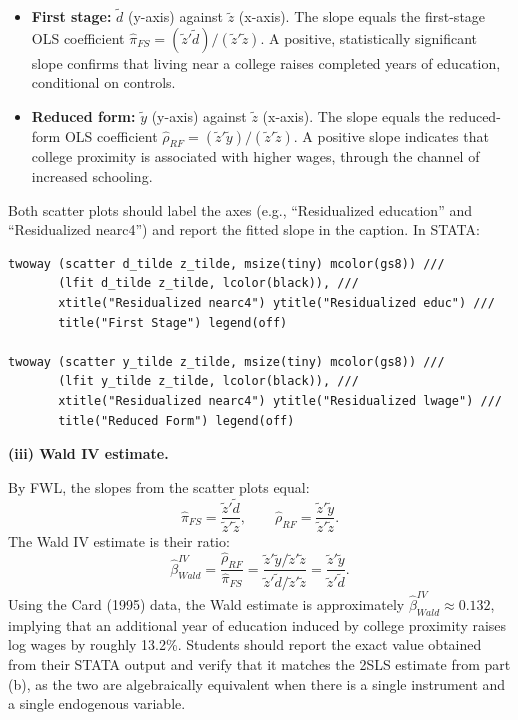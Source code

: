 \documentclass[letterpaper,12pt]{article}
\begin{document}
\begin{enumerate}[label=(\alph*)]
\begin{itemize}
    \item \textbf{First stage:} $\tilde{d}$ (y-axis) against $\tilde{z}$ (x-axis). The slope equals the first-stage OLS coefficient $\hat{\pi}_{FS} = (\tilde{z}'\tilde{d})/(\tilde{z}'\tilde{z})$. A positive, statistically significant slope confirms that living near a college raises completed years of education, conditional on controls.
    \item \textbf{Reduced form:} $\tilde{y}$ (y-axis) against $\tilde{z}$ (x-axis). The slope equals the reduced-form OLS coefficient $\hat{\rho}_{RF} = (\tilde{z}'\tilde{y})/(\tilde{z}'\tilde{z})$. A positive slope indicates that college proximity is associated with higher wages, through the channel of increased schooling.
\end{itemize}
Both scatter plots should label the axes (e.g., ``Residualized education'' and ``Residualized nearc4'') and report the fitted slope in the caption. In STATA:
\begin{verbatim}
twoway (scatter d_tilde z_tilde, msize(tiny) mcolor(gs8)) ///
       (lfit d_tilde z_tilde, lcolor(black)), ///
       xtitle("Residualized nearc4") ytitle("Residualized educ") ///
       title("First Stage") legend(off)

twoway (scatter y_tilde z_tilde, msize(tiny) mcolor(gs8)) ///
       (lfit y_tilde z_tilde, lcolor(black)), ///
       xtitle("Residualized nearc4") ytitle("Residualized lwage") ///
       title("Reduced Form") legend(off)
\end{verbatim}

\medskip
\textbf{(iii) Wald IV estimate.}

By FWL, the slopes from the scatter plots equal:
\[
\hat{\pi}_{FS} = \frac{\tilde{z}'\tilde{d}}{\tilde{z}'\tilde{z}}, \qquad \hat{\rho}_{RF} = \frac{\tilde{z}'\tilde{y}}{\tilde{z}'\tilde{z}}.
\]
The Wald IV estimate is their ratio:
\[
\hat{\beta}^{IV}_{Wald} = \frac{\hat{\rho}_{RF}}{\hat{\pi}_{FS}} = \frac{\tilde{z}'\tilde{y}/\tilde{z}'\tilde{z}}{\tilde{z}'\tilde{d}/\tilde{z}'\tilde{z}} = \frac{\tilde{z}'\tilde{y}}{\tilde{z}'\tilde{d}}.
\]
Using the Card (1995) data, the Wald estimate is approximately $\hat{\beta}^{IV}_{Wald} \approx 0.132$, implying that an additional year of education induced by college proximity raises log wages by roughly 13.2\%. Students should report the exact value obtained from their STATA output and verify that it matches the 2SLS estimate from part (b), as the two are algebraically equivalent when there is a single instrument and a single endogenous variable.


\end{enumerate}
\end{document}
